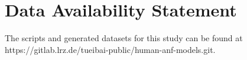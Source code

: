 \documentclass[utf8]{frontiersSCNS} %
\begin{document}
\section*{Data Availability Statement}
The scripts and generated datasets for this study can be found at https://gitlab.lrz.de/tueibai-public/human-anf-models.git.












\end{document}
